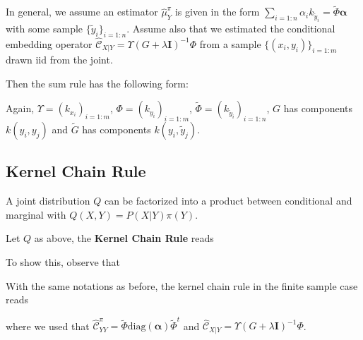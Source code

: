 In general, we assume an estimator $\widehat\mu_{Y}^{\pi}$ is given in the form $\sum_{i=1:n}\alpha_{i}k_{\tilde y_{i}}=\tilde\Phi\boldsymbol \alpha$ with some sample $\{\tilde y_{i}\}_{i=1:n}$. Assume also that we estimated the conditional embedding operator $\widehat{\mathcal C}_{X|Y}=\Upsilon(G+\lambda\mathbf I)^{-1}\Phi$ from a sample $\{(x_{i},y_{i})\}_{i=1:m}$ drawn iid from the joint.
\begin{ybox}
Then the sum rule has the following form:
\end{ybox}
Again, $\Upsilon=(k_{x_{i}})_{i=1:m}$, $\Phi=(k_{y_{i}})_{i=1:m}$, $\tilde\Phi=(k_{\tilde y_{i}})_{i=1:n}$, $G$ has components $k(y_{i},y_{j})$ and $\tilde G$ has components $k(y_{i},\tilde y_{j})$.

\subsection{Kernel Chain Rule}
A joint distribution $Q$ can be factorized into a product between conditional and marginal with $Q(X,Y)=P(X|Y)\pi(Y)$.
\begin{ybox}
Let $Q$ as above, the \textbf{Kernel Chain Rule} reads
\end{ybox}
To show this, observe that
\begin{ybox}
With the same notations as before, the kernel chain rule in the finite sample case reads
\end{ybox}
where we used that $\widehat{\mathcal C}_{YY}^{\pi}=\tilde\Phi\mathrm{diag}(\boldsymbol \alpha)\tilde \Phi^{t}$ and $\widehat{\mathcal C}_{X|Y} = \Upsilon(G+\lambda\mathbf I)^{-1}\Phi$.

